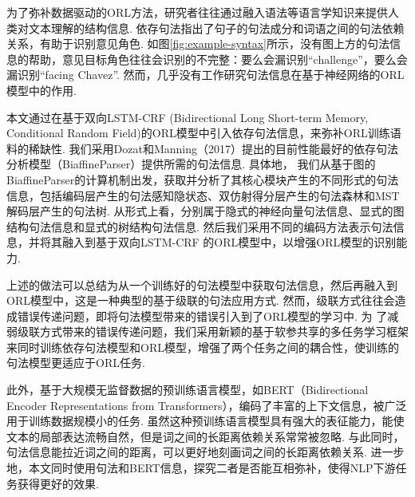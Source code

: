 为了弥补数据驱动的ORL方法，研究者往往通过融入语法等语言学知识来提供人类对文本理解的结构信息. 依存句法指出了句子的句法成分和词语之间的句法依赖关系，有助于识别意见角色. 如图\ref{fig:example-syntax}所示，没有图上方的句法信息的帮助，意见目标角色往往会识别的不完整：要么会漏识别“challenge”，要么会漏识别“facing Chavez”.
然而，几乎没有工作研究句法信息在基于神经网络的ORL模型中的作用.

本文通过在基于双向LSTM-CRF (Bidirectional Long Short-term Memory, Conditional Random Field)的ORL模型中引入依存句法信息，来弥补ORL训练语料的稀缺性.
我们采用Dozat和Manning（2017）提出的目前性能最好的依存句法分析模型（BiaffineParser）提供所需的句法信息. 具体地，
我们从基于图的BiaffineParser的计算机制出发，获取并分析了其核心模块产生的不同形式的句法信息，包括编码层产生的句法感知隐状态、双仿射得分层产生的句法森林和MST解码层产生的句法树.
从形式上看，分别属于隐式的神经向量句法信息、显式的图结构句法信息和显式的树结构句法信息.
然后我们采用不同的编码方法表示句法信息，并将其融入到基于双向LSTM-CRF 的ORL模型中，以增强ORL模型的识别能力.

上述的做法可以总结为从一个训练好的句法模型中获取句法信息，然后再融入到ORL模型中，这是一种典型的基于级联的句法应用方式.
然而，级联方式往往会造成错误传递问题，即将句法模型带来的错误引入到了ORL模型的学习中. 为
了减弱级联方式带来的错误传递问题，我们采用新颖的基于软参共享的多任务学习框架来同时训练依存句法模型和ORL模型，增强了两个任务之间的耦合性，使训练的句法模型更适应于ORL任务.

此外，基于大规模无监督数据的预训练语言模型，如BERT（Bidirectional Encoder Representations from Transformers），编码了丰富的上下文信息，被广泛用于训练数据规模小的任务.
虽然这种预训练语言模型具有强大的表征能力，能使文本的局部表达流畅自然，但是词之间的长距离依赖关系常常被忽略.
与此同时，句法信息能拉近词之间的距离，可以更好地刻画词之间的长距离依赖关系.
进一步地，本文同时使用句法和BERT信息，探究二者是否能互相弥补，使得NLP下游任务获得更好的效果.

